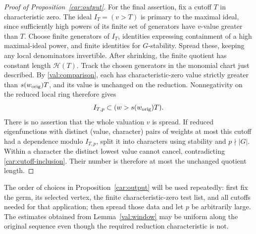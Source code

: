 \begin{proof}[Proof of Proposition~\ref{car:output}]
For the final assertion, fix a cutoff $T$ in characteristic
zero. The ideal $I_T=(v>T)$ is primary to the maximal ideal,
since sufficiently high powers of its finite set of generators
have $v$-value greater than $T$. Choose finite generators of
$I_T$, identities expressing containment of a high maximal-ideal
power, and finite identities for $G$-stability. Spread these,
keeping any local denominators invertible. After shrinking,
the finite quotient has constant length $\mathcal H(T)$.
Track the chosen generators in the monomial chart just described.
By \eqref{val:comparison}, each has characteristic-zero value
strictly greater than $s(w_{\rm orig})T$, and its value is
unchanged on the reduction. Nonnegativity on the reduced local
ring therefore gives
\begin{equation}\label{car:cutoff-inclusion}
 I_{T,p}\subset (w>s(w_{\rm orig})T).
\end{equation}
There is no assertion that the whole valuation $v$ is spread.
If reduced eigenfunctions with distinct (value, character) pairs
of weights at most this cutoff had a dependence modulo $I_{T,p}$,
split it into characters using stability and $p\nmid|G|$.
Within a character the distinct lowest value cannot cancel,
contradicting \eqref{car:cutoff-inclusion}. Their number is
therefore at most the unchanged quotient length.
\end{proof}

The order of choices in Proposition~\ref{car:output} will be used
repeatedly: first fix the germ, its selected vertex, the finite
characteristic-zero test list, and all cutoffs needed for that
application; then spread those data and let $p$ be arbitrarily
large. The estimates obtained from Lemma~\ref{val:window} may
be uniform along the original sequence even though the required
reduction characteristic is not.
